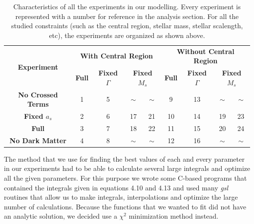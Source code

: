 \begin{table}[H]
\centering
\label{my-label}
\begin{tabular}{|c|c|c|c|c|c|c|c|c|}
\hline
\multicolumn{1}{|c|}{\multirow{3}{*}{\textbf{Experiment}}} & \multicolumn{4}{c|}{\multirow{2}{*}{\textbf{With Central Region}}}                      & \multicolumn{4}{c|}{\multirow{2}{*}{\textbf{Without Central Region}}}                     \\
\multicolumn{1}{|l|}{}                  & \multicolumn{4}{c|}{}                                                                   & \multicolumn{4}{c|}{}                                                                    \\ \cline{2-9} 
\multicolumn{1}{|l|}{}                  & \textbf{Full}    & \textbf{Fixed $\Gamma$}    & \multicolumn{2}{c|}{\textbf{Fixed $M_s$}} & \textbf{Full}     & \textbf{Fixed $\Gamma$}     & \multicolumn{2}{c|}{\textbf{Fixed $M_s$}} \\ \hline
\textbf{No Crossed Terms}               & 1                & 5                       & $\sim$               & $\sim$              & 9                 & 13                       & $\sim$               & $\sim$              \\ \hline
\textbf{Fixed $a_s$}                       & 2                & 6                       & 17                   & 21                  & 10                & 14                       & 19                   & 23                  \\ \hline
\textbf{Full}                           & 3                & 7                       & 18                   & 22                  & 11                & 15                       & 20                   & 24                  \\ \hline
\textbf{No Dark Matter}                 & 4                & 8                       & $\sim$               & $\sim$              & 12                & 16                       & $\sim$               & $\sim$              \\ \hline
\end{tabular}
\caption[Characteristics of all the experiments]{Characteristics of all the experiments in our modelling. Every experiment is represented with a number for reference in the analysis section. For all the studied constraints (such as the central region, stellar mass, stellar scalength, etc), the experiments are organized as shown above.}
\end{table}

The method that we use for finding the best values of each and every parameter in our experiments had to be able to calculate several large integrals and optimize all the given parameters. For this purpose we wrote some C-based programs that contained the integrals given in equations 4.10 and 4.13 and used many \textit{gsl} routines that allow us to make integrals, interpolations and optimize the large number of calculations. Because the functions that we wanted to fit did not have an analytic solution, we decided use a $\chi^{2}$ minimization method instead. 

